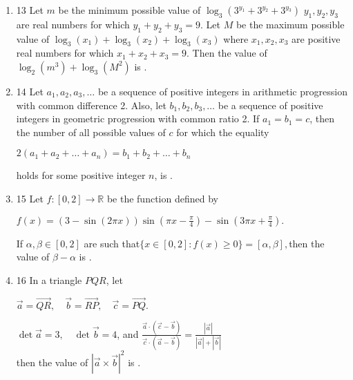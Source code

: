 \documentclass{article}
\begin{document}
\begin{enumerate}
\item 13  Let $m$ be the minimum possible value of $\log_3(3^{y_1} + 3^{y_2} + 3^{y_3})$ $y_1, y_2, y_3$ are real numbers for which $y_1 + y_2 + y_3 = 9$. Let $M$ be the maximum possible value of $\log_3(x_1) + \log_3(x_2) + \log_3(x_3)$ where $x_1, x_2, x_3$ are positive real numbers for which $x_1 + x_2 + x_3 = 9$. Then the value of $\log_2(m^3) + \log_3(M^2)$ is \underline{\hspace{2cm}}.

\item 14  Let $a_1, a_2, a_3, \dots $ be a sequence of positive integers in arithmetic progression with common difference 2. Also, let $b_1, b_2, b_3, \dots $ be a sequence of positive integers in geometric progression with common ratio 2. If $a_1 = b_1 = c$, then the number of all possible values of $c$ for which the equality 

\begin{center}
    $ 2(a_1 + a_2 + \dots + a_n) = b_1 + b_2 + \dots + b_n $
\end{center}

    holds for some positive integer $n$, is \underline{\hspace{2cm}}.

\item 15  Let $f: [0,2] \to \mathbb{R}$ be the function defined by

\begin{center}
    $f(x) = (3 - \sin(2\pi x)) \sin\left(\pi x - \frac{\pi}{4}\right) - \sin(3\pi x + \frac{\pi}{4}).$
\end{center}
If $\alpha, \beta \in [0,2]$ are such that$\{ x \in [0,2] : f(x) \geq 0 \} = [\alpha, \beta],$then the value of $\beta - \alpha$ is \underline{\hspace{2cm}}.

\item 16  In a triangle $PQR$, let 
   
\begin{center}
   $\vec{a} = \overrightarrow{QR}, \quad \vec{b} = \overrightarrow{RP}, \quad \vec{c} = \overrightarrow{PQ}.$
\end{center}

	$\det{\vec{a}}= 3, \quad \det{\vec{b}} = 4$, and 
	$\frac{\vec{a} \cdot (\vec{c} - \vec{b})}{\vec{c} \cdot (\vec{a} - \vec{b})} = \frac{|\vec{a}|}{|\vec{a}| + |\vec{b}|}$\\

    then the value of $|\vec{a} \times \vec{b}|^2$ is \underline{\hspace{2cm}}.


\end{enumerate}
\end{document}
